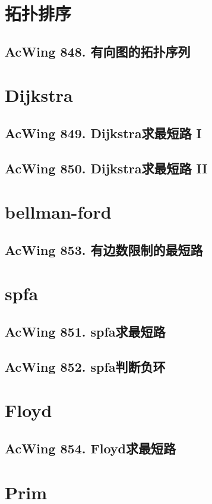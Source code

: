 \section{拓扑排序}
\subsection{AcWing 848. 有向图的拓扑序列}

\section{Dijkstra}
\subsection{AcWing 849. Dijkstra求最短路 I}
\subsection{AcWing 850. Dijkstra求最短路 II}

\section{bellman-ford}
\subsection{AcWing 853. 有边数限制的最短路}

\section{spfa}
\subsection{AcWing 851. spfa求最短路}
\subsection{AcWing 852. spfa判断负环}

\section{Floyd}
\subsection{AcWing 854. Floyd求最短路}

\section{Prim}
